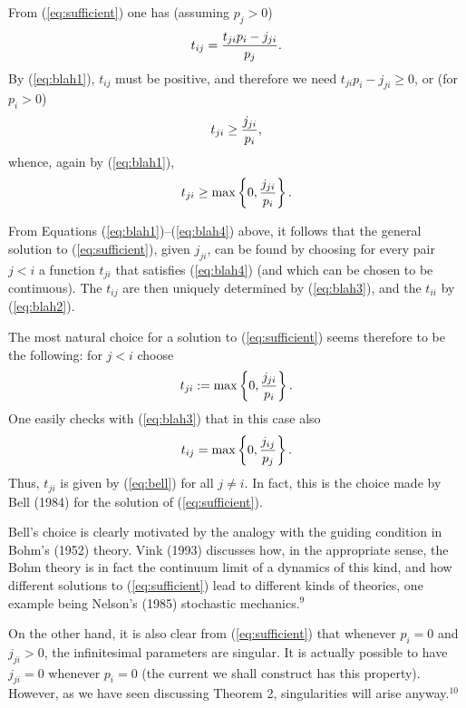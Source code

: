 \documentclass[12pt]{article}
\newcommand{\be}{\vspace*{6pt} \begin{equation}}
\newcommand{\ee}{\vspace*{10pt} \end{equation}}
\begin{document}
From (\ref{eq:sufficient}) one has (assuming $p_j>0$)
\be
\label{eq:blah3}
t_{ij}=\frac{t_{ji}p_i-j_{ji}}{p_j}.
\ee
By (\ref{eq:blah1}), $t_{ij}$ must be positive, and therefore we need
$t_{ji}p_i-j_{ji}\geq 0$, or (for $p_i>0$)
\be
t_{ji}\geq\frac{j_{ji}}{p_i},
\ee
whence, again by (\ref{eq:blah1}),
\be
\label{eq:blah4}
t_{ji}\geq\max \left\{ { 0,\frac{j_{ji}}{p_i} } \right\}.
\ee

From Equations (\ref{eq:blah1})--(\ref{eq:blah4}) above, it follows 
that the general solution to (\ref{eq:sufficient}), given $j_{ji}$, 
can be found by choosing for every pair $j<i$ a function $t_{ji}$ that 
satisfies (\ref{eq:blah4}) (and which can be chosen to be continuous).  
The $t_{ij}$ are then uniquely determined by (\ref{eq:blah3}), and the 
$t_{ii}$ by (\ref{eq:blah2}).

The most natural choice for a solution to (\ref{eq:sufficient}) seems 
therefore to be the following: for $j<i$ choose
\be
\label{eq:bell}
t_{ji}:=\max \left\{ { 0,\frac{j_{ji}}{p_i} } \right\}.
\ee
One easily checks with
(\ref{eq:blah3}) that in this case also
\be
t_{ij}=\max \left\{ { 0,\frac{j_{ij}}{p_j} } \right\}.
\ee
Thus, $t_{ji}$ is given by (\ref{eq:bell}) for all $j\neq i$.  In fact,
this is the choice made by Bell (1984) for the solution of
(\ref{eq:sufficient}).

Bell's choice is clearly motivated by the analogy with the guiding 
condition in Bohm's (1952) theory.  Vink (1993) discusses how, in the 
appropriate sense, the Bohm theory is in fact the continuum limit of a 
dynamics of this kind, and how different solutions to 
(\ref{eq:sufficient}) lead to different kinds of theories, one example 
being Nelson's (1985) stochastic mechanics.$^9$

On the other hand, it is also clear from (\ref{eq:sufficient}) that 
whenever $p_i=0$ and $j_{ji}>0$, the infinitesimal parameters are 
singular.  It is actually possible to have $j_{ji}=0$ whenever $p_i=0$ 
(the current we shall construct has this property).  However, as we 
have seen discussing Theorem 2, singularities will arise 
anyway.$^{10}$
\end{document}
